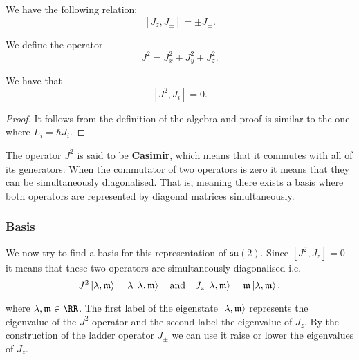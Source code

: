 \documentclass[12pt, a4paper]{article}
\begin{document}
\begin{proposition}
    We have the following relation:
    \[[J_z,J_{\pm}]=\pm J_{\pm}.\]
\end{proposition}

\begin{definition}
    We define the operator
    \[J^2 = J_x^2+J_y^2+J_z^2.\]
\end{definition}

\begin{theorem}
    We have that 
    \[[J^2,J_i]=0.\]
\end{theorem}

\begin{proof}
    It follows from the definition of the algebra and proof is similar to the one where \(L_i=\hbar J_i\).
\end{proof}

\begin{mdnote}
    The operator \(J^2\) is said to be \textbf{Casimir}, which means that it commutes with all of its generators. When the commutator of two operators is zero it means that they can be simultaneously diagonalised. That is, meaning there exists a basis where both operators are represented by diagonal matrices simultaneously.
\end{mdnote}

\subsubsection*{Basis}

We now try to find a basis for this representation of \(\mathfrak{su}(2)\). Since \([J^2,J_z]=0\) it means that these two operators are simultaneously diagonalised i.e.\
\[J^2\ket{\lambda,\mathfrak{m}} = \lambda \ket{\lambda,\mathfrak{m}}\quad \text{and}\quad J_z\ket{\lambda,\mathfrak{m}} = \mathfrak{m}\ket{\lambda,\mathfrak{m}}.\]

\noindent where \(\lambda,\mathfrak{m} \in \RR\). The first label of the eigenstate \(\ket{\lambda,\mathfrak{m}}\) represents the eigenvalue of the \(J^2\) operator and the second label the eigenvalue of \(J_z\). By the construction of the ladder operator \(J_{\pm}\) we can use it raise or lower the eigenvalues of \(J_z\).
\end{document}
